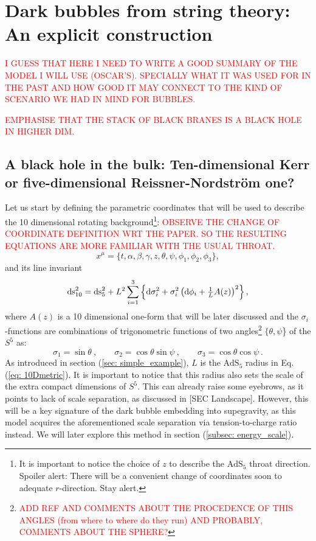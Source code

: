 \section{Dark bubbles from string theory: An explicit construction}\label{sec: db_from_st}
\textcolor{red}{I GUESS THAT HERE I NEED TO WRITE A GOOD SUMMARY OF THE MODEL I WILL USE (OSCAR'S). SPECIALLY WHAT IT WAS USED FOR IN THE PAST AND HOW GOOD IT MAY CONNECT TO THE KIND OF SCENARIO WE HAD IN MIND FOR BUBBLES.}

\textcolor{red}{EMPHASISE THAT THE STACK OF BLACK BRANES IS A BLACK HOLE IN HIGHER DIM.}
\subsection{A black hole in the bulk: Ten-dimensional Kerr or five-dimensional Reissner-Nordström one?}
Let us start by defining the parametric coordinates that will be used to describe the 10 dimensional rotating background\footnote{It is important to notice the choice of $z$ to describe the $\text{AdS}_{5}$ throat direction. Spoiler alert: There will be a convenient change of coordinates soon to adequate $r$-direction. Stay alert.}:
\textcolor{red}{OBSERVE THE CHANGE OF COORDINATE DEFINITION WRT THE PAPER. SO THE RESULTING EQUATIONS ARE MORE FAMILIAR WITH THE USUAL THROAT.}
\begin{equation}\label{eq: 10D_coordinates}
	x^{\mu} = \{t, \alpha, \beta, \gamma, z, \theta, \psi, \phi_{1},\phi_{2},\phi_{3}\},
\end{equation}
and its line invariant
\begin{equation}\label{eq: 10Dmetric}
  \text{ds}_{10}^2= \text{ds}_5^2 + L^2 \sum_{i=1}^3 \left\{ \text{d}\sigma_i^2 + \sigma_i^2 \left( \text{d}\phi_i + \tfrac{1}{L} A(z) \right)^2 \right\},
\end{equation}
where $A(z)$ is a 10 dimensional one-form that will be later discussed and the $\sigma_i$-functions are combinations of trigonometric functions of two angles\footnote{\textcolor{red}{ADD REF AND COMMENTS ABOUT THE PROCEDENCE OF THIS ANGLES (from where to where do they run) AND PROBABLY, COMMENTS ABOUT THE SPHERE?}} $\{\theta, \psi$\} of the $S^{5}$ as:
\begin{equation}
 \sigma_1 = \sin\theta \ , \qquad \sigma_2 = \cos\theta \sin\psi \ , \qquad \sigma_3 = \cos\theta \cos\psi \ .
\end{equation}
As introduced in section (\ref{sec: simple_example}), $L$ is the $\text{AdS}_{5}$ radius in Eq. (\ref{eq: 10Dmetric}). It is important to notice that this radius also sets the scale of the extra compact dimensions of $S^{5}$. This can already raise some eyebrows, as it points to lack of scale separation, as discussed in [SEC Landscape]. However, this will be a key signature of the dark bubble embedding into supegravity, as this model acquires the aforementioned scale separation via tension-to-charge ratio instead. We will later explore this method in section (\ref{subsec: energy_scale}). 

